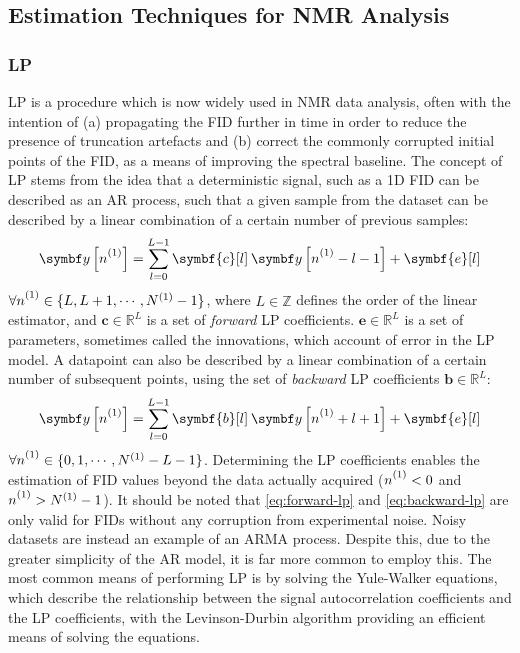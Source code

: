 \subsection{Estimation Techniques for NMR Analysis}

\subsubsection{\Acl{LP}}

\Ac{LP}\cite{Stephenson1988,Koehl1999} is a procedure which is now widely used
in \ac{NMR} data analysis, often with the intention of (a) propagating the
\ac{FID} further in time in order to reduce the presence of truncation
artefacts and (b) correct the commonly corrupted initial points of the
\ac{FID}, as a means of improving the spectral baseline. The concept of \ac{LP}
stems from the idea that a deterministic signal, such as a \ac{1D} \ac{FID} can
be described as an \ac{AR} process, such that a given sample from the dataset
can be described by a linear combination of a certain number of previous
samples:
\begin{equation}
    \by \left[\none\right] = \sum_{l=0}^{L-1}
    \symbf{c}[l] \hspace{2pt} \by \left[ \none - l - 1\right] + \symbf{e} [l]
    \label{eq:forward-lp}
\end{equation}
$\forall \none \in \lbrace L, L + 1, \cdots, \None - 1 \rbrace$, where $L \in
\mathbb{Z}$ defines the order of the linear estimator, and $\symbf{c} \in
\mathbb{R}^{L}$ is a set of \emph{forward} \ac{LP} coefficients. $\symbf{e} \in
\mathbb{R}^L$ is a set of parameters, sometimes called the innovations, which
account of error in the \ac{LP} model. A datapoint can also be described by a
linear combination of a certain number of subsequent points, using the set of
\emph{backward} \ac{LP} coefficients $\symbf{b} \in \mathbb{R}^L$:
\begin{equation}
    \by \left[\none\right] = \sum_{l=0}^{L-1}
    \symbf{b}[l] \hspace{2pt} \by \left[ \none + l + 1\right] + \symbf{e} [l]
    \label{eq:backward-lp}
\end{equation}
$\forall \none \in \lbrace 0, 1, \cdots, \None - L - 1 \rbrace$. Determining
the \ac{LP} coefficients enables the estimation of \ac{FID} values beyond the
data actually acquired ($\none < 0$ and $\none > \None - 1$). It should be noted that
\eqref{eq:forward-lp} and \eqref{eq:backward-lp} are only valid for
\acp{FID} without any corruption from experimental noise. Noisy datasets are
instead an example of an \ac{ARMA} process. Despite this, due to the greater
simplicity of the \ac{AR} model, it is far more common to employ this. The most
common means of performing \ac{LP} is by solving the Yule-Walker
equations\cite{Yule1927,Walker1931},
which describe the relationship between the signal autocorrelation coefficients
and the \ac{LP} coefficients\cite[Section 3.3]{Koehl1999}, with the
Levinson-Durbin algorithm providing an efficient means of solving the
equations\cite{Levinson1946,Durbin1960}.

